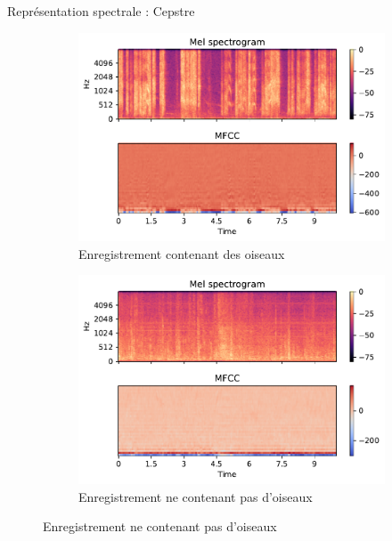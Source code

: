 \documentclass[compress,xcolor=table]{beamer}
\begin{document}
\begin{frame}{Représentation spectrale : Cepstre}
\begin{figure}[ht]
        \begin{subfigure}[b]{0.45\textwidth}
            \centering
            \includegraphics[width=\textwidth]{../images/audio/birds.mfcc.ff1010.pdf}
            \caption{Enregistrement contenant des oiseaux}
            \label{fig:birds.mfcc.ff1010}
        \end{subfigure}
        \hfill
        \begin{subfigure}[b]{0.45\textwidth}
            \centering
            \includegraphics[width=\textwidth]{../images/audio/nobirds.mfcc.ff1010.pdf}
            \caption{Enregistrement ne contenant pas d'oiseaux}
            \label{fig:nobirds.mfcc.ff1010}
        \end{subfigure}


    \end{figure}

\end{frame}
\end{document}
